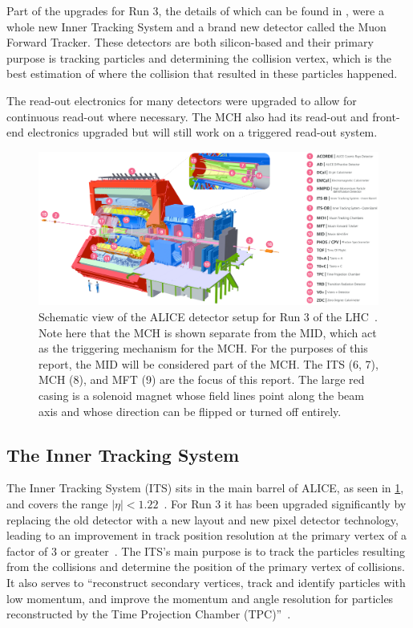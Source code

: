 Part of the upgrades for Run 3, the details of which can be found in \cite{ALICE_Upgrade_LOI}, were a whole new Inner Tracking System and a brand new detector called the Muon Forward Tracker. These detectors are both silicon-based and their primary purpose is tracking particles and determining the collision vertex, which is the best estimation of where the collision that resulted in these particles happened. 

The read-out electronics for many detectors were upgraded to allow for continuous read-out where necessary. The MCH also had its read-out and front-end electronics upgraded but will still work on a triggered read-out system.

\begin{figure}[h]
    \begin{center}
        \includegraphics[width=\textwidth]{Figs/ALICE_RUN3_schematic.png}
        \caption[Schematic view of the ALICE detector setup for Run 3 of the LHC]{Schematic view of the ALICE detector setup for Run 3 of the LHC~\cite{ALICE_schematic_labels}. Note here that the MCH is shown separate from the MID, which act as the triggering mechanism for the MCH. For the purposes of this report, the MID will be considered part of the MCH. The ITS (6, 7), MCH (8), and MFT (9) are the focus of this report. The large red casing is a solenoid magnet whose field lines point along the beam axis and whose direction can be flipped or turned off entirely.}
        \label{fig:ALICE_Schematic}
    \end{center}
\end{figure}


\subsection{The Inner Tracking System}
The Inner Tracking System (ITS) sits in the main barrel of ALICE, as seen in \cref{fig:ALICE_Schematic}, and covers the range $|\eta|<1.22$~\cite{ITS_Upgrade_TDR}. For Run 3 it has been upgraded significantly by replacing the old detector with a new layout and new pixel detector technology, leading to an improvement in track position resolution at the primary vertex of a factor of 3 or greater~\cite{ITS_Upgrade_TDR}. The ITS's main purpose is to track the particles resulting from the collisions and determine the position of the primary vertex of collisions. It also serves to ``reconstruct secondary vertices, track and identify particles with low momentum, and improve the momentum and angle resolution for particles reconstructed by the Time Projection Chamber (TPC)''~\cite{ITS_Info}.

